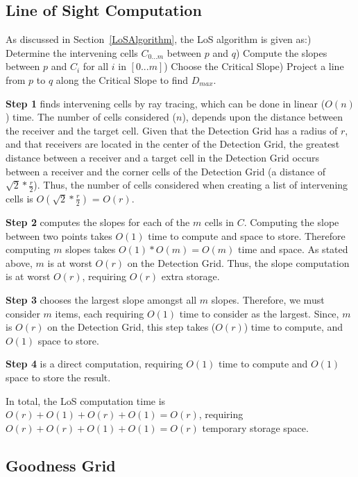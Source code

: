 \subsection{Line of Sight Computation}
As discussed in Section~\ref{LoSAlgorithm}, the LoS algorithm is given as:) Determine the intervening cells $C_{0...m}$ between $p$ and $q$) Compute the slopes between $p$ and $C_i$ for all $i$ in $[0 ... m]$) Choose the Critical Slope) Project a line from $p$ to $q$ along the Critical Slope to find $D_{max}$.\newline

\textbf{Step 1} finds intervening cells by ray tracing, which can be done in linear ($O(n)$) time.  The number of cells considered ($n$), depends upon the distance between the receiver and the target cell\cite{rayTracing}.  Given that the Detection Grid has a radius of $r$, and that receivers are located in the center of the Detection Grid, the greatest distance between a receiver and a target cell in the Detection Grid occurs between a receiver and the corner cells of the Detection Grid (a distance of $\sqrt2*\frac{r}{2}$).  Thus, the number of cells considered when creating a list of intervening cells is $O(\sqrt2*\frac{r}{2})$ = $O(r)$.

\textbf{Step 2} computes the slopes for each of the $m$ cells in $C$.  Computing the slope between two points takes $O(1)$ time to compute and space to store.  Therefore computing $m$ slopes takes $O(1)*O(m)=O(m)$ time and space.  As stated above, $m$ is at worst $O(r)$ on the Detection Grid.  Thus, the slope computation is at worst $O(r)$, requiring $O(r)$ extra storage.

\textbf{Step 3} chooses the largest slope amongst all $m$ slopes.  Therefore, we must consider $m$ items, each requiring $O(1)$ time to consider as the largest.  Since, $m$ is $O(r)$ on the Detection Grid, this step takes ($O(r)$) time to compute, and $O(1)$ space to store.  

\textbf{Step 4} is a direct computation, requiring $O(1)$ time to compute and $O(1)$ space to store the result.

In total, the LoS computation time is $O(r) + O(1) + O(r) + O(1) = O(r)$, requiring $O(r) + O(r) + O(1) + O(1) = O(r)$ temporary storage space.

\subsection{Goodness Grid}

